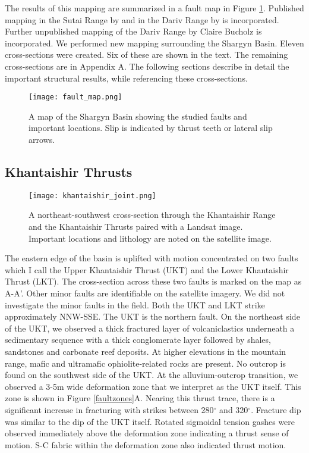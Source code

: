 The results of this mapping are summarized in a fault map in Figure \ref{faultmap}. Published mapping in the Sutai Range by \citet{Cunningham2003} and in the Dariv Range by \citet{Dijkstra2006} is incorporated. Further unpublished mapping of the Dariv Range by Claire Bucholz is incorporated. We performed new mapping surrounding the Shargyn Basin. Eleven cross-sections were created. Six of these are shown in the text. The remaining cross-sections are in Appendix A. The following sections describe in detail the important structural results, while referencing these cross-sections.
 
\begin{figure}[h!]
  \centering
  \texttt{[image: fault\_map.png]}
  \caption{A map of the Shargyn Basin showing the studied faults and important locations. Slip is indicated by thrust teeth or lateral slip arrows.}
  \label{faultmap}
\end{figure}


\subsection{Khantaishir Thrusts}

\begin{figure}[h!]
  \centering
  \texttt{[image: khantaishir\_joint.png]}
  \caption{A northeast-southwest cross-section through the Khantaishir Range and the Khantaishir Thrusts paired with a Landsat image. Important locations and lithology are noted on the satellite image.}
\end{figure}

The eastern edge of the basin is uplifted with motion concentrated on two faults which I call the Upper Khantaishir Thrust (UKT) and the Lower Khantaishir Thrust (LKT). The cross-section across these two faults is marked on the map as A-A'. Other minor faults are identifiable on the satellite imagery. We did not investigate the minor faults in the field. Both the UKT and LKT strike approximately NNW-SSE. The UKT is the northern fault. On the northeast side of the UKT, we observed a thick fractured layer of volcaniclastics underneath a sedimentary sequence with a thick conglomerate layer followed by shales, sandstones and carbonate reef deposits. At higher elevations in the mountain range, mafic and ultramafic ophiolite-related rocks are present. No outcrop is found on the southwest side of the UKT. At the alluvium-outcrop transition, we observed a 3-5m wide deformation zone that we interpret as the UKT itself. This zone is shown in Figure \ref{faultzones}A. Nearing this thrust trace, there is a significant increase in fracturing with strikes between 280$^{\circ}$ and 320$^{\circ}$. Fracture dip was similar to the dip of the UKT itself. Rotated sigmoidal tension gashes were observed immediately above the deformation zone indicating a thrust sense of motion. S-C fabric within the deformation zone also indicated thrust motion.

